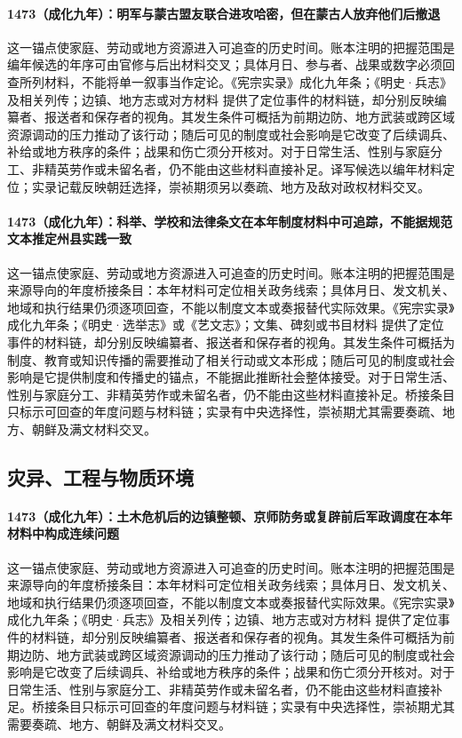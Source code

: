 \paragraph{1473（成化九年）：明军与蒙古盟友联合进攻哈密，但在蒙古人放弃他们后撤退} 这一锚点使家庭、劳动或地方资源进入可追查的历史时间。账本注明的把握范围是编年候选的年序可由官修与后出材料交叉；具体月日、参与者、战果或数字必须回查所列材料，不能将单一叙事当作定论。《宪宗实录》成化九年条；《明史·兵志》及相关列传；边镇、地方志或对方材料 提供了定位事件的材料链，却分别反映编纂者、报送者和保存者的视角。其发生条件可概括为前期边防、地方武装或跨区域资源调动的压力推动了该行动；随后可见的制度或社会影响是它改变了后续调兵、补给或地方秩序的条件；战果和伤亡须分开核对。对于日常生活、性别与家庭分工、非精英劳作或未留名者，仍不能由这些材料直接补足。译写候选以编年材料定位；实录记载反映朝廷选择，崇祯期须另以奏疏、地方及敌对政权材料交叉。

\paragraph{1473（成化九年）：科举、学校和法律条文在本年制度材料中可追踪，不能据规范文本推定州县实践一致} 这一锚点使家庭、劳动或地方资源进入可追查的历史时间。账本注明的把握范围是来源导向的年度桥接条目：本年材料可定位相关政务线索；具体月日、发文机关、地域和执行结果仍须逐项回查，不能以制度文本或奏报替代实际效果。《宪宗实录》成化九年条；《明史·选举志》或《艺文志》；文集、碑刻或书目材料 提供了定位事件的材料链，却分别反映编纂者、报送者和保存者的视角。其发生条件可概括为制度、教育或知识传播的需要推动了相关行动或文本形成；随后可见的制度或社会影响是它提供制度和传播史的锚点，不能据此推断社会整体接受。对于日常生活、性别与家庭分工、非精英劳作或未留名者，仍不能由这些材料直接补足。桥接条目只标示可回查的年度问题与材料链；实录有中央选择性，崇祯期尤其需要奏疏、地方、朝鲜及满文材料交叉。

\subsection{灾异、工程与物质环境}

\paragraph{1473（成化九年）：土木危机后的边镇整顿、京师防务或复辟前后军政调度在本年材料中构成连续问题} 这一锚点使家庭、劳动或地方资源进入可追查的历史时间。账本注明的把握范围是来源导向的年度桥接条目：本年材料可定位相关政务线索；具体月日、发文机关、地域和执行结果仍须逐项回查，不能以制度文本或奏报替代实际效果。《宪宗实录》成化九年条；《明史·兵志》及相关列传；边镇、地方志或对方材料 提供了定位事件的材料链，却分别反映编纂者、报送者和保存者的视角。其发生条件可概括为前期边防、地方武装或跨区域资源调动的压力推动了该行动；随后可见的制度或社会影响是它改变了后续调兵、补给或地方秩序的条件；战果和伤亡须分开核对。对于日常生活、性别与家庭分工、非精英劳作或未留名者，仍不能由这些材料直接补足。桥接条目只标示可回查的年度问题与材料链；实录有中央选择性，崇祯期尤其需要奏疏、地方、朝鲜及满文材料交叉。

